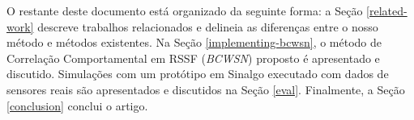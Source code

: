 \documentclass{acm_proc_article-sp}
\begin{document}
% 
% 

O restante deste documento está organizado da seguinte forma: a Seção 
\ref{related-work} descreve trabalhos relacionados e delineia as diferenças
entre o nosso método e métodos existentes. Na Seção \ref{implementing-bcwsn},
o método de Correlação Comportamental em RSSF ({\it BCWSN}) proposto é apresentado e 
discutido. Simulações com um protótipo em Sinalgo \cite{Sinalgo2007} executado
com dados de sensores reais são apresentados e discutidos na Seção \ref{eval}.
Finalmente, a Seção \ref{conclusion} conclui o artigo.
\vspace*{-.3cm}
\end{document}
